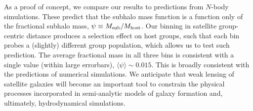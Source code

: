 As a proof of concept, we compare our results to predictions from $N$-body simulations. These 
predict that the subhalo mass function is a function only of the fractional subhalo mass, $\psi 
\equiv M_{\rm sub}/M_{\rm host}$. Our binning in satellite group-centric distance produces a 
selection effect on host groups, such that each bin probes a (slightly) different group population, 
which allows us to test such prediction. The average fractional mass in all three bins is consistent 
with a single value (within large errorbars), $\langle\psi\rangle\sim0.015$. This is broadly 
consistent with the predictions of numerical simulations. We anticipate that weak lensing of 
satellite galaxies will become an important tool to constrain the physical processes incorporated in 
semi-analytic models of galaxy formation and, ultimately, hydrodynamical simulations.


